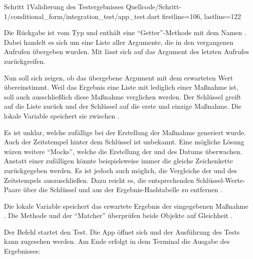 \begin{alexlisting}{Schritt 1}{Validierung des Testergebnisses}
  {Quellcode/Schritt-1/conditional_form/integration_test/app_test.dart}
  {firstline=106, lastline=122}

  \label{lst:Schritt1ButtonZumSpeichernWirdAusgelöst}
\end{alexlisting}

Die Rückgabe ist vom Typ  und enthält eine \enquote{Getter}-Methode mit dem Namen .
Dabei handelt es sich um eine Liste aller Argumente, die in den vergangenen Aufrufen übergeben wurden.
Mit  lässt sich auf das Argument des letzten Aufrufes zurückgreifen.

Nun soll sich zeigen, ob das übergebene Argument mit dem erwarteten Wert übereinstimmt.
Weil das Ergebnis eine Liste mit lediglich einer Maßnahme ist, soll auch ausschließlich diese Maßnahme verglichen werden.
Der Schlüssel  greift auf die Liste zurück und der Schlüssel  auf die erste und einzige Maßnahme.
Die lokale Variable  speichert sie zwischen .

Es ist unklar, welche zufällige  bei der Erstellung der Maßnahme generiert wurde.
Auch der Zeitstempel hinter dem Schlüssel  ist unbekannt.
Eine mögliche Lösung wären weitere \enquote{Mocks}, welche die Erstellung der  und des Datums überwachen. Anstatt einer zufälligen  könnte beispielsweise immer die gleiche Zeichenkette zurückgegeben werden.
Es ist jedoch auch möglich, die Vergleiche der  und des Zeitstempels auszuschließen.
Dazu reicht es, die entsprechenden Schlüssel-Werte-Paare über die Schlüssel  und  aus der Ergebnis-Hashtabelle zu entfernen .

Die lokale Variable  speichert das erwartete Ergebnis der eingegebenen Maßnahme .
Die Methode  und der \enquote{Matcher}  überprüfen beide Objekte auf Gleichheit .

Der Befehl  startet den Test.
Die App öffnet sich und der Ausführung des Tests kann zugesehen werden.
Am Ende erfolgt in dem Terminal die Ausgabe des Ergebnisses: 

